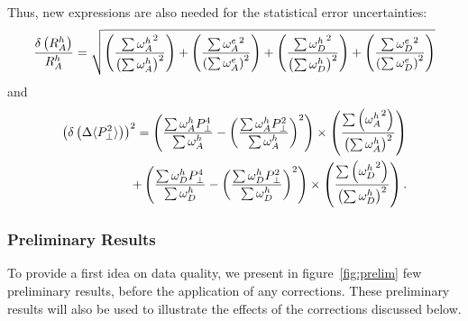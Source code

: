 Thus, new expressions are also needed for the statistical error uncertainties: 
\begin{equation}
{\delta \left ( R_A^h \right ) \over R_A^h} = 
      \sqrt{ \left ( {\sum {\omega^h_A}^2 \over \left (\sum \omega^h_A \right )^2} \right ) 
           + \left ( {\sum {\omega^e_A}^2 \over \left (\sum \omega^e_A \right )^2} \right ) 
           + \left ( {\sum {\omega^h_D}^2 \over \left (\sum \omega^h_D \right )^2} \right ) 
           + \left ( {\sum {\omega^e_D}^2 \over \left (\sum \omega^e_D \right )^2} \right ) }
\end{equation}
 and 
\begin{equation}
\begin{split}
\left ( \delta \left ( \Delta \langle P_\perp^2 \rangle \right ) \right )^2 = 
   \left ({{\sum \omega^h_A P_\perp^4 }\over{\sum \omega^h_A}} - \left ({\sum \omega^h_A P_\perp^2 }\over{\sum \omega^h_A}\right )^2 \right ) 
         \times \left ( {\sum \left ( {\omega^h_A}^2 \right ) \over \left ( \sum \omega^h_A \right ) ^2 }\right ) \\
 + \left ({{\sum \omega^h_D P_\perp^4 }\over{\sum \omega^h_D}} - \left ({\sum \omega^h_D P_\perp^2 }\over{\sum \omega^h_D}\right )^2 \right ) 
	 \times \left ( {\sum \left ( {\omega^h_D}^2 \right ) \over \left ( \sum \omega^h_D \right ) ^2 }\right ).
\end{split}
\end{equation}

\subsubsection{Preliminary Results}
\label{prelim}

To provide a first idea on data quality, we present in figure~\ref{fig:prelim} 
few preliminary results, before the application 
of any corrections. These preliminary results will also be used to 
illustrate the effects of the corrections discussed below.

